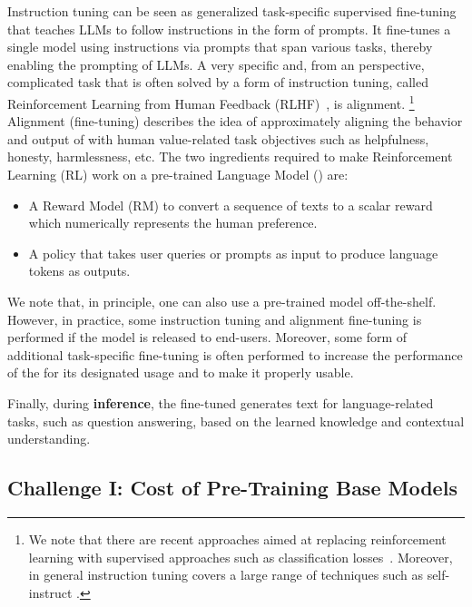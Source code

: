 Instruction tuning can be seen as generalized task-specific supervised fine-tuning that teaches LLMs to follow instructions in the form of prompts.
It fine-tunes a single model using instructions via prompts that span various tasks, thereby enabling the prompting of LLMs. A very specific and, from an \AutoML perspective, complicated task that is often solved by a form of instruction tuning, called Reinforcement Learning from Human Feedback (RLHF)~\cite{fernandes-arxiv23a}, is alignment.%
\footnote{We note that there are recent approaches aimed at replacing reinforcement learning with supervised approaches such as classification losses~\cite{rafailov-arxiv23a}. Moreover, in general instruction tuning covers a large range of techniques such as self-instruct \cite{wang-acl23a}.}
Alignment (fine-tuning) describes the idea of approximately aligning the behavior and output of \LLMs with human value-related task objectives such as helpfulness, honesty, harmlessness, etc.
The two ingredients required to make Reinforcement Learning (RL) work on a pre-trained Language Model (\LM) are:
\begin{itemize}
    \item A Reward Model (RM) to convert a sequence of texts to a scalar reward which numerically represents the human preference.
    \item A policy that takes user queries or prompts as input to produce language tokens as outputs.
\end{itemize}

We note that, in principle, one can also use a pre-trained model off-the-shelf. However, in practice, some instruction tuning and alignment fine-tuning is performed if the model is released to end-users. Moreover, some form of additional task-specific fine-tuning is often performed to increase the performance of the \LLM for its designated usage and to make it properly usable.

Finally, during \textbf{inference}, the fine-tuned \LLM generates text for language-related tasks, such as question answering, based on the learned knowledge and contextual understanding.

\subsection{Challenge I: Cost of Pre-Training Base Models}

